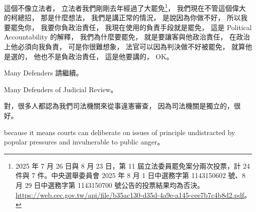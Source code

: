 \hypertarget{w06:cue:1566}{}這個不像立法者，
\hypertarget{w06:cue:1567}{}立法者我們剛剛去年經過了大罷免\footnote{2025 年 7 月 26 日與 8 月 23 日，第 11 屆立法委員罷免案分兩次投票，計 24 件與 7 件。中央選舉委員會 2025 年 8 月 1 日中選務字第 1143150602 號、8 月 29 日中選務字第 1143150700 號公告的投票結果均為否決。\url{https://web.cec.gov.tw/api/file/b35ac130-d35d-4a9e-a145-cee7b7c4b8d2.pdf}。}，
\hypertarget{w06:cue:1568}{}我們現在不管這個偉大的柯總招，
\hypertarget{w06:cue:1569}{}那是什麼想法，
\hypertarget{w06:cue:1570}{}我們是講正常的情況，
\hypertarget{w06:cue:1571}{}是說因為你做不好，
\hypertarget{w06:cue:1572}{}所以我要罷免你，
\hypertarget{w06:cue:1573}{}我要你負政治責任，
\hypertarget{w06:cue:1574}{}我現在使用的負責手段就是罷免，
\hypertarget{w06:cue:1575}{}這是 Political Accountability 的解釋，
\hypertarget{w06:cue:1576}{}我們為什麼要罷免，
\hypertarget{w06:cue:1577}{}就是要讓客與他政治責任，
\hypertarget{w06:cue:1578}{}在政治上他必須向我負責，
\hypertarget{w06:cue:1579}{}可是你很難想象，
\hypertarget{w06:cue:1580}{}法官可以因為判決做不好被罷免，
\hypertarget{w06:cue:1581}{}就算他是選的，
\hypertarget{w06:cue:1582}{}他也不是負政治責任，
\hypertarget{w06:cue:1583}{}這是他要講的，
\hypertarget{w06:cue:1584}{}OK。

\hypertarget{w06:cue:1585}{}Many Defenders
\hypertarget{w06:cue:1586}{}請繼續。

\hypertarget{w06:cue:1587}{}Many Defenders of Judicial Review。

\hypertarget{w06:cue:1588}{}對，很多人都認為我們司法機關來從事違憲審查，
\hypertarget{w06:cue:1589}{}因為司法機關是獨立的，很好。

\hypertarget{w06:cue:1590}{}because it means courts can deliberate on issues of principle
\hypertarget{w06:cue:1591}{}undistracted by popular pressures and invulnerable to public anger。

